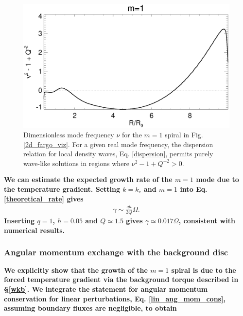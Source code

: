 \begin{figure}
  \includegraphics[width=\linewidth]{figures/m1_analysis_Qbar_fargo} 
  \caption{Dimensionless mode frequency $\nu$ for the $m=1$ spiral in
    Fig. \ref{2d_fargo_viz}. For a given real mode frequency, the
    dispersion relation for local density waves, Eq. \ref{dispersion},
    permits purely wave-like solutions in regions where $\nu^2 - 1 +
    Q^{-2}>0$.    
    \label{fargo_qbarrier}} 
\end{figure}


{\bf
  We can estimate the expected growth rate of the $m=1$ mode due to the
  temperature gradient. Setting $k = k_c$ and $m=1$ into
  Eq. \ref{theoretical_rate} gives
  \begin{align}\label{theoretical_rate1}
    \gamma \sim \frac{qh}{2Q}\Omega. 
  \end{align}
  Inserting $q=1$, $h=0.05$ and $Q\simeq 1.5$  gives
  $\gamma \simeq 0.017\Omega$, consistent with numerical
  results.  
}




\subsubsection{Angular momentum exchange with the background disc}  
{\bf We explicitly show that the growth of the $m=1$ spiral is due to
  the forced temperature gradient via the background torque described
  in \S\ref{wkb}. We integrate the statement for angular momentum 
  conservation for linear perturbations, Eq. \ref{lin_ang_mom_cons},
  assuming boundary fluxes are negligible, to obtain
}

